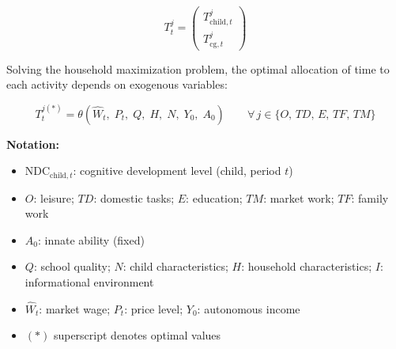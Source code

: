 \documentclass[12pt]{article}
\newcommand{\NDC}{\mathrm{NDC}}
\newcommand{\child}{\text{child}}
\newcommand{\cg}{\text{cg}}   %
\begin{document}
\begin{equation}
  T_t^{j} = \begin{pmatrix} T_{\child,t}^{j} \\ T_{\cg,t}^{j} \end{pmatrix}
  \tag{A.14}
  \label{appeq:timej}
\end{equation}

Solving the household maximization problem, the optimal allocation of time to
each activity depends on exogenous variables:

\begin{equation}
  T_t^{j(*)} = \theta\!\left(\hat{W}_t,\; P_t,\; Q,\; H,\; N,\;
               Y_0,\; A_0\right)
  \qquad \forall\, j \in \{O,\, TD,\, E,\, TF,\, TM\}
  \tag{A.15}
  \label{appeq:optimal}
\end{equation}

\noindent\textbf{Notation:}
\begin{itemize}\setlength{\itemsep}{2pt}
  \item $\NDC_{\child,t}$: cognitive development level (child, period $t$)
  \item $O$: leisure; $TD$: domestic tasks; $E$: education;
        $TM$: market work; $TF$: family work
  \item $A_0$: innate ability (fixed)
  \item $Q$: school quality; $N$: child characteristics; $H$: household
        characteristics; $I$: informational environment
  \item $\hat{W}_t$: market wage; $P_t$: price level; $Y_0$: autonomous income
  \item $(*)$ superscript denotes optimal values
\end{itemize}
\end{document}
